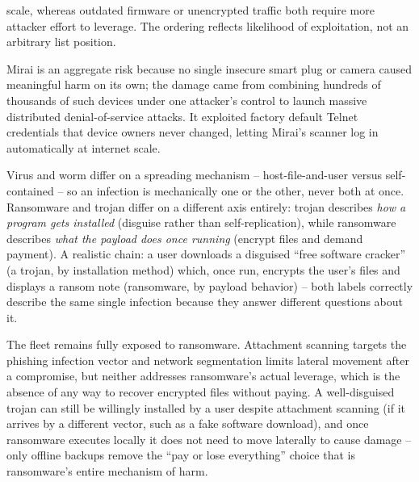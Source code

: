 \begin{answerkey}
scale, whereas outdated firmware or unencrypted traffic both require more attacker effort to
leverage. The ordering reflects likelihood of exploitation, not an arbitrary list position.
\item Mirai is an aggregate risk because no single insecure smart plug or camera caused meaningful
harm on its own; the damage came from combining hundreds of thousands of such devices under one
attacker's control to launch massive distributed denial-of-service attacks. It exploited factory
default Telnet credentials that device owners never changed, letting Mirai's scanner log in
automatically at internet scale.
\item Virus and worm differ on a spreading mechanism -- host-file-and-user versus self-contained --
so an infection is mechanically one or the other, never both at once. Ransomware and trojan differ
on a different axis entirely: trojan describes \emph{how a program gets installed} (disguise
rather than self-replication), while ransomware describes \emph{what the payload does once
running} (encrypt files and demand payment). A realistic chain: a user downloads a disguised
``free software cracker'' (a trojan, by installation method) which, once run, encrypts the user's
files and displays a ransom note (ransomware, by payload behavior) -- both labels correctly
describe the same single infection because they answer different questions about it.
\item The fleet remains fully exposed to ransomware. Attachment scanning targets the phishing
infection vector and network segmentation limits lateral movement after a compromise, but neither
addresses ransomware's actual leverage, which is the absence of any way to recover encrypted files
without paying. A well-disguised trojan can still be willingly installed by a user despite
attachment scanning (if it arrives by a different vector, such as a fake software download), and
once ransomware executes locally it does not need to move laterally to cause damage -- only offline
backups remove the ``pay or lose everything'' choice that is ransomware's entire mechanism of
harm.
\end{answerkey}

